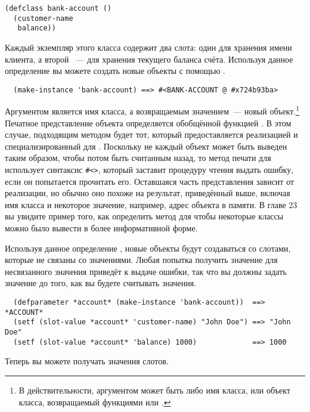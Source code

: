 \begin{lstlisting}
(defclass bank-account ()
  (customer-name
   balance))
\end{lstlisting}

Каждый экземпляр этого класса содержит два слота: один для хранения имени клиента, а
второй ~--- для хранения текущего баланса счёта.  Используя данное определение вы можете
создать новые объекты  с помощью .

\begin{verbatim}
  (make-instance 'bank-account) ==> #<BANK-ACCOUNT @ #x724b93ba>
\end{verbatim}

Аргументом  является имя класса, а возвращаемым значением~--- новый
объект.\footnote{В действительности, аргументом  может быть либо имя
  класса, или объект класса, возвращаемый функциями  или
  .}  Печатное представление объекта определяется обобщённой функцией
.  В этом случае, подходящим методом будет тот, который предоставляется
реализацией и специализированный для .  Поскольку не каждый объект
может быть выведен таким образом, чтобы потом быть считанным назад, то метод печати для
 использует синтаксис \lstinline!#<>!, который заставит процедуру
чтения выдать ошибку, если он попытается прочитать его.  Оставшаяся часть представления
зависит от реализации, но обычно оно похоже на результат, приведённый выше, включая имя
класса и некоторое значение, например, адрес объекта в памяти.  В главе 23 вы увидите
пример того, как определить метод для  чтобы некоторые классы можно
было вывести в более информативной форме.

Используя данное определение , новые объекты будут создаваться со
слотами, которые не связаны со значениями.  Любая попытка получить значение для
несвязанного значения приведёт к выдаче ошибки, так что вы должны задать значение до того,
как вы будете считывать значения.

\begin{verbatim}
  (defparameter *account* (make-instance 'bank-account))  ==> *ACCOUNT*
  (setf (slot-value *account* 'customer-name) "John Doe") ==> "John Doe"
  (setf (slot-value *account* 'balance) 1000)             ==> 1000
\end{verbatim}

Теперь вы можете получать значения слотов.

